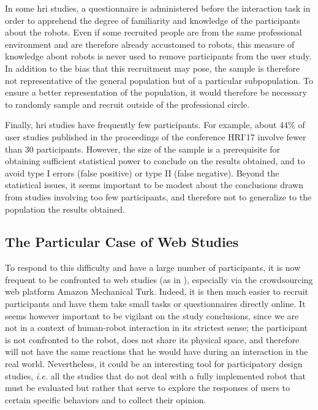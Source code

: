 \documentclass[a4paper,11pt,twoside]{StyleThese}
\begin{document}
In some \acrshort{hri} studies, a questionnaire is administered before the interaction task in order to apprehend the degree of familiarity and knowledge of the participants about the robots. Even if some recruited people are from the same professional environment and are therefore already accustomed to robots, this measure of knowledge about robots is never used to remove participants from the user study. In addition to the bias that this recruitment may pose, the sample is therefore not representative of the general population but of a particular subpopulation. To ensure a better representation of the population, it would therefore be necessary to randomly sample and recruit outside of the professional circle.

Finally, \acrshort{hri} studies have frequently few participants. For example, about 44\% of user studies published in the proceedings of the conference HRI'17 involve fewer than 30 participants. However, the size of the sample is a prerequisite for obtaining sufficient statistical power to conclude on the results obtained, and to avoid type I errors (false positive) or type II (false negative). Beyond the statistical issues, it seems important to be modest about the conclusions drawn from studies involving too few participants, and therefore not to generalize to the population the results obtained.

\subsection*{The Particular Case of Web Studies}

To respond to this difficulty and have a large number of participants, it is now frequent to be confronted to web studies (as in \cite{khambhaita_head-body_2016}), especially via the crowdsourcing web platform Amazon Mechanical Turk. Indeed, it is then much easier to recruit participants and have them take small tasks or questionnaires directly online. It seems however important to be vigilant on the study conclusions, since we are not in a context of human-robot interaction in its strictest sense; the participant is not confronted to the robot, does not share its physical space, and therefore will not have the same reactions that he would have during an interaction in the real world. Nevertheless, it could be an interesting tool for participatory design studies, \textit{i.e.} all the studies that do not deal with a fully implemented robot that must be evaluated but rather that serve to explore the responses of users to certain specific behaviors and to collect their opinion. 
\end{document}
